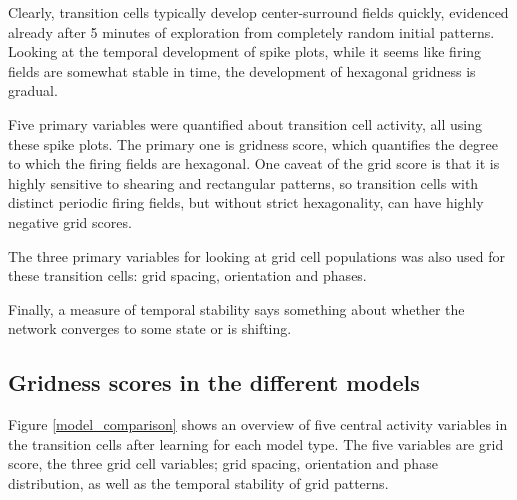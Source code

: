 \documentclass{article}
\begin{document}
    Clearly, transition cells typically develop center-surround fields quickly, evidenced already after 5 minutes of exploration from completely random initial patterns. Looking at the temporal development of spike plots, while it seems like firing fields are somewhat stable in time, the development of hexagonal gridness is gradual.

    Five primary variables were quantified about transition cell activity, all using these spike plots. The primary one is gridness score, which quantifies the degree to which the firing fields are hexagonal. One caveat of the grid score is that it is highly sensitive to shearing and rectangular patterns, so transition cells with distinct periodic firing fields, but without strict hexagonality, can have highly negative grid scores.
    
    The three primary variables for looking at grid cell populations was also used for these transition cells: grid spacing, orientation and phases. 
    
    Finally, a measure of temporal stability says something about whether the network converges to some state or is shifting. 

    \subsection{Gridness scores in the different models}

    Figure \ref{model_comparison} shows an overview of five central activity variables in the transition cells after learning for each model type. The five variables are grid score, the three grid cell variables; grid spacing, orientation and phase distribution, as well as the temporal stability of grid patterns. 
    
\end{document}
